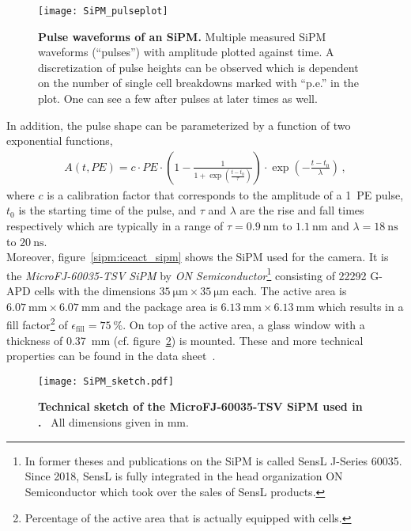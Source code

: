 \begin{figure}[H]
	\centering
	\texttt{[image: SiPM\_pulseplot]}
	\caption[Pulse waveforms of an SiPM]{\textbf{Pulse waveforms of an SiPM.} \cite{sipm:hamamatsu_handbook} Multiple measured SiPM waveforms (\enquote{pulses}) with amplitude plotted against time. A discretization of pulse heights can be observed which is dependent on the number of single cell breakdowns marked with \enquote{p.e.} in the plot. One can see a few after pulses at later times as well.}
	\label{sipm:pulses}
\end{figure}

In addition, the pulse shape can be parameterized by a function of two exponential functions,~\cite{sipm:fact_calibration}
\begin{align}
	A(t,PE) = c\cdot PE \cdot \left(1-\frac{1}{1+\exp\left(\frac{t-t_0}{\tau}\right)}\right)\cdot\exp\left(-\frac{t-t_0}{\lambda}\right)\,,
\end{align}
where $c$ is a calibration factor that corresponds to the amplitude of a \SI{1}{PE} pulse, $t_0$ is the starting time of the pulse, and $\tau$ and $\lambda$ are the rise and fall times respectively which are typically in a range of $\tau=\SI{0.9}{\nano\meter}$ to $\SI{1.1}{\nano\meter}$ and $\lambda=\SI{18}{\nano\second}$ to $\SI{20}{\nano\second}$.~\cite{sipm:fact_calibration}\\

Moreover, figure~\ref{sipm:iceact_sipm} shows the SiPM used for the \iceact camera. It is the\textit{ MicroFJ-60035-TSV SiPM} by \textit{ON Semiconductor}\footnote{In former theses and publications on \iceact the SiPM is called SensL J-Series 60035. Since 2018, SensL is fully integrated in the head organization ON Semiconductor which took over the sales of SensL products.} consisting of \num{22292} G-APD cells with the dimensions $\SI{35}{\micro\meter}\times\SI{35}{\micro\meter}$ each. The active area is $\SI{6.07}{\milli\meter}\times\SI{6.07}{\milli\meter}$ and the package area is $\SI{6.13}{\milli\meter}\times\SI{6.13}{\milli\meter}$ which results in a fill factor\footnote{Percentage of the active area that is actually equipped with cells.} of $\epsilon_\text{fill}=\SI{75}{\percent}$. On top of the active area, a glass window with a thickness of \SI{0.37}{\milli\meter} (cf. figure~\ref{sipm:tec_sketch}) is mounted. These and more technical properties can be found in the data sheet~\cite{sipm:datasheet}.

\begin{figure}[H]
	\centering
	\texttt{[image: SiPM\_sketch.pdf]}
	\caption[Technical sketch of the \iceact SiPM]{\textbf{Technical sketch of the MicroFJ-60035-TSV SiPM used in \iceact.}~\cite{sipm:datasheet} All dimensions given in \si{\milli\meter}.}
	\label{sipm:tec_sketch}	
\end{figure}

